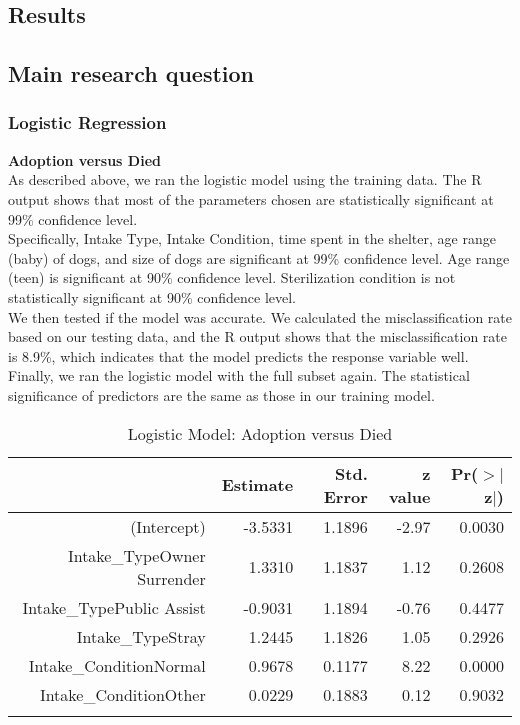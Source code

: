 \documentclass[12pt]{article}
\begin{document}
\begin{flushleft}
\section{Results}
\subsection{Main research question}
 \subsubsection{Logistic Regression}
\textbf{Adoption versus Died}\\
As described above, we ran the logistic model using the training data. The R output shows that most of the parameters chosen are statistically significant at 99\% confidence level.\\
Specifically, Intake Type, Intake Condition, time spent in the shelter, age range (baby) of dogs, and size of dogs are significant at 99\% confidence level. Age range (teen) is significant at 90\% confidence level. Sterilization condition is not statistically significant at 90\% confidence level. \\
We then tested if the model was accurate. We calculated the misclassification rate based on our testing data, and the R output shows that the misclassification rate is 8.9\%, which indicates that the model predicts the response variable well. \\
Finally, we ran the logistic model with the full subset again. The statistical significance of predictors are the same as those in our training model. \\
\begin{center}
\begin{table}[H]
\centering
\caption{Logistic Model: Adoption versus Died}
\begin{tabular}{rrrrr}
  \hline
 & Estimate & Std. Error & z value & Pr($>$$|$z$|$) \\ 
  \hline
(Intercept) & -3.5331 & 1.1896 & -2.97 & 0.0030 \\ 
  Intake\_TypeOwner Surrender & 1.3310 & 1.1837 & 1.12 & 0.2608 \\ 
  Intake\_TypePublic Assist & -0.9031 & 1.1894 & -0.76 & 0.4477 \\ 
  Intake\_TypeStray & 1.2445 & 1.1826 & 1.05 & 0.2926 \\ 
  Intake\_ConditionNormal & 0.9678 & 0.1177 & 8.22 & 0.0000 \\ 
  Intake\_ConditionOther & 0.0229 & 0.1883 & 0.12 & 0.9032 \\ 
$$
\end{tabular}
\end{table}
\end{center}
\end{flushleft}
\end{document}
